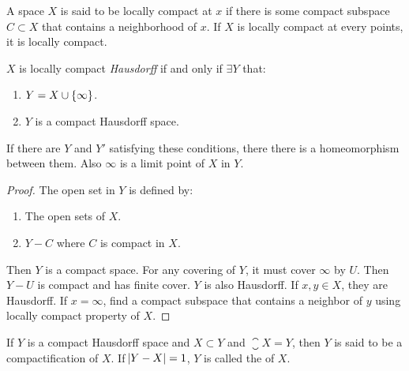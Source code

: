 \begin{definition}
    A space $X$ is said to be locally compact at $x$ if there is some compact subspace $C \subset X$ that contains a neighborhood of $x$. If $X$ is locally compact at every points, it is locally compact.
\end{definition}


\begin{theorem}
    $X$ is locally compact \emph{Hausdorff} if and only if $\exists Y$ that:
    \begin{enumerate}
        \item $Y = X \cup \set{\infty}$.
        \item $Y$ is a compact Hausdorff space.
    \end{enumerate}
    
    If there are $Y$ and $Y'$ satisfying these conditions, there there is a homeomorphism between them. Also $\infty$ is a limit point of $X$ in $Y$.
\end{theorem}
\begin{proof}
    The open set in $Y$ is defined by:
    \begin{enumerate}
        \item The open sets of $X$.
        \item $Y -C$ where $C$ is compact in $X$.
    \end{enumerate}
    
    Then $Y$ is a compact space. For any covering of $Y$, it must cover $\infty$ by $U$. Then $Y-U$ is compact and has finite cover. $Y$ is also Hausdorff. If $x,y \in X$, they are Hausdorff. If $x =\infty$, find a compact subspace that contains a neighbor of $y$ using locally compact property of $X$.
\end{proof}

\begin{definition}
    If $Y$ is a compact Hausdorff space and $X \subset Y$ and $\closure{X} = Y$, then $Y$ is said to be a compactification of $X$. If $\abs{Y - X} = 1$, $Y$ is called the  of $X$.
\end{definition}

